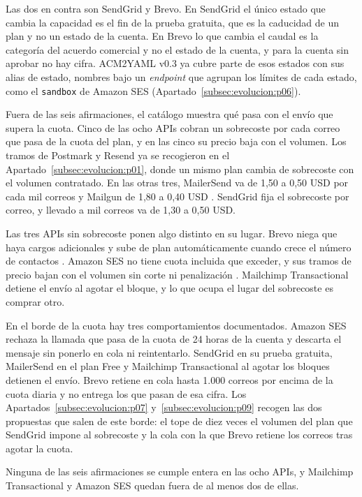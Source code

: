 Las dos en contra son SendGrid y Brevo.
En SendGrid el único estado que cambia la capacidad es el fin de la prueba gratuita, que es la caducidad de un plan y no un estado de la cuenta.
En Brevo lo que cambia el caudal es la categoría del acuerdo comercial y no el estado de la cuenta, y para la cuenta sin aprobar no hay cifra.
ACM2YAML v0.3 ya cubre parte de esos estados con sus alias de estado, nombres bajo un \textit{endpoint} que agrupan los límites de cada estado, como el \texttt{sandbox} de Amazon SES (Apartado~\ref{subsec:evolucion:p06}).

Fuera de las seis afirmaciones, el catálogo muestra qué pasa con el envío que supera la cuota.
Cinco de las ocho APIs cobran un sobrecoste por cada correo que pasa de la cuota del plan, y en las cinco su precio baja con el volumen.
Los tramos de Postmark y Resend ya se recogieron en el Apartado~\ref{subsec:evolucion:p01}, donde un mismo plan cambia de sobrecoste con el volumen contratado.
En las otras tres, MailerSend va de 1,50 a 0,50 USD por cada mil correos y Mailgun de 1,80 a 0,40 USD \citep{mailgunpricing}.
SendGrid fija el sobrecoste por correo, y llevado a mil correos va de 1,30 a 0,50 USD.

Las tres APIs sin sobrecoste ponen algo distinto en su lugar.
Brevo niega que haya cargos adicionales y sube de plan automáticamente cuando crece el número de contactos \citep{brevopricing}.
Amazon SES no tiene cuota incluida que exceder, y sus tramos de precio bajan con el volumen sin corte ni penalización \citep{sespricing}.
Mailchimp Transactional detiene el envío al agotar el bloque, y lo que ocupa el lugar del sobrecoste es comprar otro.

En el borde de la cuota hay tres comportamientos documentados.
Amazon SES rechaza la llamada que pasa de la cuota de 24 horas de la cuenta y descarta el mensaje sin ponerlo en cola ni reintentarlo.
SendGrid en su prueba gratuita, MailerSend en el plan Free y Mailchimp Transactional al agotar los bloques detienen el envío.
Brevo retiene en cola hasta 1.000 correos por encima de la cuota diaria y no entrega los que pasan de esa cifra.
Los Apartados~\ref{subsec:evolucion:p07} y~\ref{subsec:evolucion:p09} recogen las dos propuestas que salen de este borde: el tope de diez veces el volumen del plan que SendGrid impone al sobrecoste y la cola con la que Brevo retiene los correos tras agotar la cuota.

Ninguna de las seis afirmaciones se cumple entera en las ocho APIs, y Mailchimp Transactional y Amazon SES quedan fuera de al menos dos de ellas.
